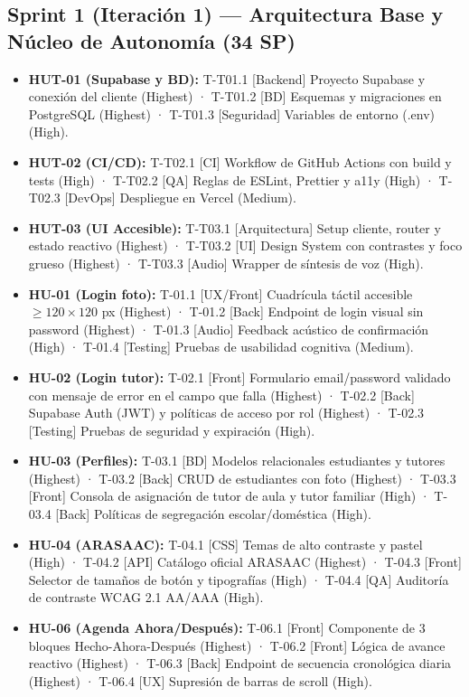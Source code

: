 \documentclass[11pt,a4paper]{article}
\begin{document}
\subsection{Sprint 1 (Iteración 1) — Arquitectura Base y Núcleo de Autonomía (34 SP)}
\begin{itemize}
\item \textbf{HUT-01 (Supabase y BD):} T-T01.1 [Backend] Proyecto Supabase y conexión del cliente (Highest) · T-T01.2 [BD] Esquemas y migraciones en PostgreSQL (Highest) · T-T01.3 [Seguridad] Variables de entorno (.env) (High).
\item \textbf{HUT-02 (CI/CD):} T-T02.1 [CI] Workflow de GitHub Actions con build y tests (High) · T-T02.2 [QA] Reglas de ESLint, Prettier y a11y (High) · T-T02.3 [DevOps] Despliegue en Vercel (Medium).
\item \textbf{HUT-03 (UI Accesible):} T-T03.1 [Arquitectura] Setup cliente, router y estado reactivo (Highest) · T-T03.2 [UI] Design System con contrastes y foco grueso (Highest) · T-T03.3 [Audio] Wrapper de síntesis de voz (High).
\item \textbf{HU-01 (Login foto):} T-01.1 [UX/Front] Cuadrícula táctil accesible $\geq 120 \times 120$ px (Highest) · T-01.2 [Back] Endpoint de login visual sin password (Highest) · T-01.3 [Audio] Feedback acústico de confirmación (High) · T-01.4 [Testing] Pruebas de usabilidad cognitiva (Medium).
\item \textbf{HU-02 (Login tutor):} T-02.1 [Front] Formulario email/password validado con mensaje de error en el campo que falla (Highest) · T-02.2 [Back] Supabase Auth (JWT) y políticas de acceso por rol (Highest) · T-02.3 [Testing] Pruebas de seguridad y expiración (High).
\item \textbf{HU-03 (Perfiles):} T-03.1 [BD] Modelos relacionales estudiantes y tutores (Highest) · T-03.2 [Back] CRUD de estudiantes con foto (Highest) · T-03.3 [Front] Consola de asignación de tutor de aula y tutor familiar (High) · T-03.4 [Back] Políticas de segregación escolar/doméstica (High).
\item \textbf{HU-04 (ARASAAC):} T-04.1 [CSS] Temas de alto contraste y pastel (High) · T-04.2 [API] Catálogo oficial ARASAAC (Highest) · T-04.3 [Front] Selector de tamaños de botón y tipografías (High) · T-04.4 [QA] Auditoría de contraste WCAG 2.1 AA/AAA (High).
\item \textbf{HU-06 (Agenda Ahora/Después):} T-06.1 [Front] Componente de 3 bloques Hecho-Ahora-Después (Highest) · T-06.2 [Front] Lógica de avance reactivo (Highest) · T-06.3 [Back] Endpoint de secuencia cronológica diaria (Highest) · T-06.4 [UX] Supresión de barras de scroll (High).

\end{itemize}
\end{document}
